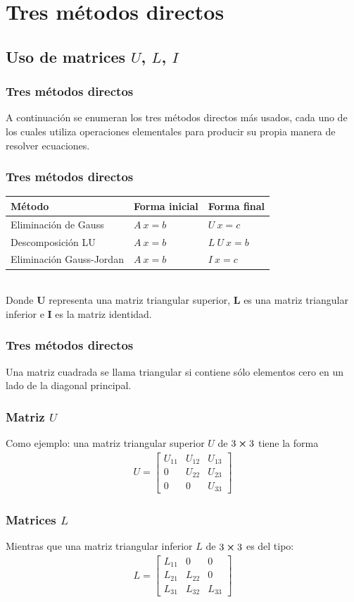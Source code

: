 \section{Tres métodos directos}
\subsection{Uso de matrices \texorpdfstring{$U$}{}, \texorpdfstring{$L$}{}, \texorpdfstring{$I$}{}}
\begin{frame}
\frametitle{Tres métodos directos}
A continuación se enumeran los tres métodos directos más usados, cada uno de los cuales utiliza operaciones elementales para producir su propia manera de resolver ecuaciones.
\end{frame}
\begin{frame}
\frametitle{Tres métodos directos}
\fontsize{12}{12}\selectfont
\begin{tabular}{l l l}
Método & Forma inicial & Forma final \\ \hline
Eliminación de Gauss & $A \: x = b$ & $U\: x = c$ \\
Descomposición LU & $A \: x = b$ & $L\: U\: x = b$ \\
Eliminación Gauss-Jordan & $A \: x = b$ & $I \: x = c$
\end{tabular}
\\
\bigskip
\fontsize{14}{14}\selectfont
Donde $\mathbf{U}$ representa una matriz triangular superior, $\mathbf{L}$ es una matriz triangular inferior e $\mathbf{I}$ es la matriz identidad. 
\end{frame}
\begin{frame}
\frametitle{Tres métodos directos}
Una matriz cuadrada se llama triangular si contiene sólo elementos cero en un lado de la diagonal principal.
\end{frame}
\begin{frame}
\frametitle{Matriz $U$}
Como ejemplo: una matriz triangular superior $U$ de $3 \cp 3$  tiene la forma
\begin{align*}
U = \begin{bmatrix}
U_{11} & U_{12} & U_{13} \\
0 & U_{22} & U_{23} \\
0 & 0 & U_{33}
\end{bmatrix}
\end{align*}
\end{frame}
\begin{frame}
\frametitle{Matrices $L$}
Mientras que una matriz triangular inferior $L$ de $3 \cp 3$ es del tipo:
\begin{align*}
L = \begin{bmatrix}
L_{11} & 0 & 0 \\
L_{21} & L_{22} & 0 \\
L_{31} & L_{32} & L_{33}
\end{bmatrix}
\end{align*}
\end{frame}
